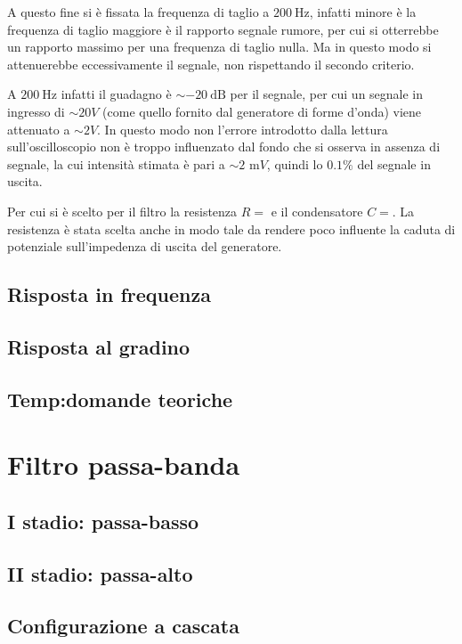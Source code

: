 \documentclass[10pt,a4paper]{article}
\newcommand\Hz{\text{Hz}}
\newcommand\dB{\text{dB}}
\newcommand\m{\text{~m}}
\begin{document}
A questo fine si è fissata la frequenza di taglio a $200~\Hz$, infatti minore è la frequenza di taglio maggiore è il rapporto segnale rumore, per cui si otterrebbe un rapporto massimo per una frequenza di taglio nulla. Ma in questo modo si attenuerebbe eccessivamente il segnale, non rispettando il secondo criterio.

A $200~\Hz$ infatti il guadagno è $\sim -20~\dB$ per il segnale, per cui un segnale in ingresso di $\sim 20V$ (come quello fornito dal generatore di forme d'onda) viene attenuato a $\sim 2V$. In questo modo non l'errore introdotto dalla lettura sull'oscilloscopio non è troppo influenzato dal fondo che si osserva in assenza di segnale, la cui intensità stimata è pari a $\sim 2\m V$, quindi lo $0.1\%$ del segnale in uscita.

Per cui si è scelto per il filtro la resistenza $R = $ e il condensatore $C = $. La resistenza è stata scelta anche in modo tale da rendere poco influente la caduta di potenziale sull'impedenza di uscita del generatore. 

\subsection{Risposta in frequenza}

\subsection{Risposta al gradino}

\subsection{Temp:domande teoriche}

\section{Filtro passa-banda}

\subsection{I stadio: passa-basso}

\subsection{II stadio: passa-alto}

\subsection{Configurazione a cascata}

\end{document}
